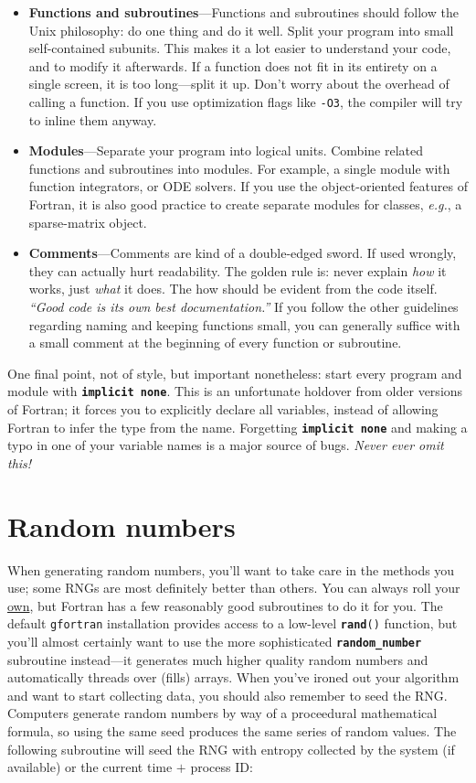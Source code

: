 \documentclass[openany,oneside]{report}
\newcommand{\keyword}[1]{\texttt{\bfseries\color{DarkBlue}#1}}
\begin{document}
\begin{itemize}
  \item\textbf{Functions and subroutines}---Functions and subroutines should follow the Unix philosophy: do one thing and do it well.
    Split your program into small self-contained subunits.
    This makes it a lot easier to understand your code, and to modify it afterwards.
    If a function does not fit in its entirety on a single screen, it is too long---split it up.
    Don't worry about the overhead of calling a function.
    If you use optimization flags like \texttt{-O3}, the compiler will try to inline them anyway.
  \item\textbf{Modules}---Separate your program into logical units.
    Combine related functions and subroutines into modules.
    For example, a single module with function integrators, or ODE solvers.
    If you use the object-oriented features of Fortran, it is also good practice to create separate modules for classes, \emph{e.g.}, a sparse-matrix object.
  \item\textbf{Comments}---Comments are kind of a double-edged sword.
    If used wrongly, they can actually hurt readability.
    The golden rule is: never explain \emph{how} it works, just \emph{what} it does.
    The how should be evident from the code itself.
    \emph{``Good code is its own best documentation.''} If you follow the other guidelines regarding naming and keeping functions small, you can generally suffice with a small comment at the beginning of every function or subroutine.
\end{itemize}
One final point, not of style, but important nonetheless: start every program and module with \keyword{implicit none}.
This is an unfortunate holdover from older versions of Fortran; it forces you to explicitly declare all variables, instead of allowing Fortran to infer the type from the name.
Forgetting \keyword{implicit none} and making a typo in one of your variable names is a major source of bugs.
\emph{Never ever omit this!}

\appendix

\chapter{Random numbers}
\label{chap:Random numbers}
When generating random numbers, you'll want to take care in the methods you use; some RNGs are most definitely better than others.
You can always roll your \href{http://xkcd.com/221/}{own}, but Fortran has a few reasonably good subroutines to do it for you.
The default \texttt{gfortran} installation provides access to a low-level \texttt{\keyword{rand}()} function, but you'll almost certainly want to use the more sophisticated \keyword{random\_number} subroutine instead---it generates much higher quality random numbers and automatically threads over (fills) arrays.
When you've ironed out your algorithm and want to start collecting data, you should also remember to seed the RNG.
Computers generate random numbers by way of a proceedural mathematical formula, so using the same seed produces the same series of random values.
The following subroutine will seed the RNG with entropy collected by the system (if available) or the current time $+$ process ID:

\end{document}
